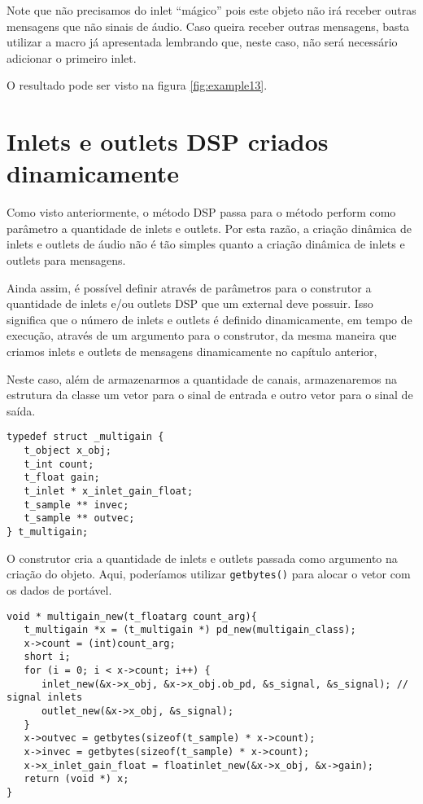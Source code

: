 Note que não precisamos do inlet ``mágico'' pois este objeto não irá receber
outras mensagens que não sinais de áudio.
Caso queira receber outras mensagens, basta utilizar a macro já apresentada
lembrando que, neste caso, não será necessário adicionar o primeiro inlet.

O resultado pode ser visto na figura \ref{fig:example13}.


\section{Inlets e outlets DSP criados dinamicamente}

Como visto anteriormente, o método DSP passa para o método perform como parâmetro
a quantidade de inlets e outlets.
Por esta razão, a criação dinâmica de inlets e outlets de áudio não é tão simples
quanto a criação dinâmica de inlets e outlets para mensagens.

Ainda assim, é possível definir através de parâmetros para o construtor a
quantidade de inlets e/ou outlets DSP que um external deve possuir.
Isso significa que o número de inlets e outlets é definido dinamicamente,
em tempo de execução, através de um argumento para o construtor, da mesma
maneira que criamos inlets e outlets de mensagens dinamicamente no
capítulo anterior, 

Neste caso, além de armazenarmos a quantidade de canais, armazenaremos na
estrutura da classe um vetor para o sinal de entrada e outro vetor para o sinal
de saída.

\begin{lstlisting}[caption=Estrutura da classe para inlets e outlets DSP dinâmicos]
typedef struct _multigain {
   t_object x_obj;
   t_int count;
   t_float gain;
   t_inlet * x_inlet_gain_float;
   t_sample ** invec;
   t_sample ** outvec;
} t_multigain;
\end{lstlisting}

O construtor cria a quantidade de inlets e outlets passada
como argumento na criação do objeto.
Aqui, poderíamos utilizar \texttt{getbytes()} para alocar o vetor com os dados
de portável.

\begin{lstlisting}[caption=Estrutura do construtor para iolets DSP dinâmicos]
void * multigain_new(t_floatarg count_arg){
   t_multigain *x = (t_multigain *) pd_new(multigain_class);
   x->count = (int)count_arg;
   short i;
   for (i = 0; i < x->count; i++) {
      inlet_new(&x->x_obj, &x->x_obj.ob_pd, &s_signal, &s_signal); // signal inlets
      outlet_new(&x->x_obj, &s_signal);
   }
   x->outvec = getbytes(sizeof(t_sample) * x->count);
   x->invec = getbytes(sizeof(t_sample) * x->count);
   x->x_inlet_gain_float = floatinlet_new(&x->x_obj, &x->gain);
   return (void *) x;
}
\end{lstlisting}

